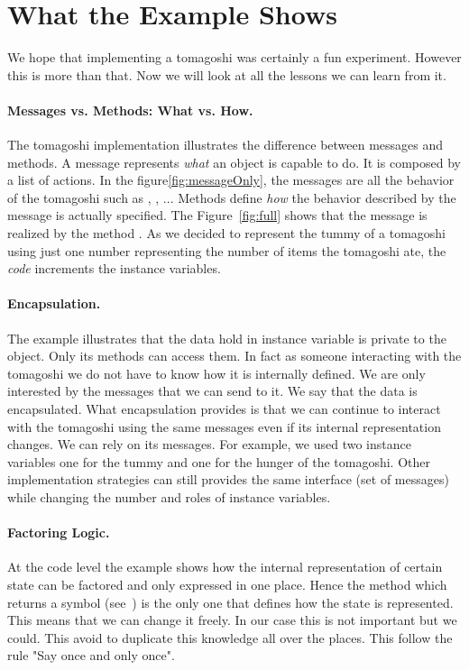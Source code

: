 \documentclass[a4paper,10pt,twoside]{book}
\begin{document}
\section{What the Example Shows}
We hope that implementing a tomagoshi was certainly a fun experiment. However this is more than that. Now we will look at all the lessons
we can learn from it. 


\paragraph{Messages vs. Methods: What vs. How.} The tomagoshi implementation illustrates the difference between messages and  methods. A message represents \textit{what} an object is capable to do. It is composed by a list of actions. 
In the figure\ref{fig:messageOnly}, the messages are all the behavior of the tomagoshi such as , , ... Methods define \textit{how} the behavior described by the message is actually specified. The Figure~\ref{fig:full} shows that the message  is realized by the method . As we decided to represent the tummy 
of a tomagoshi using just one number representing the number of items the tomagoshi ate, the \textit{code} 
increments the  instance variables. 




\paragraph{Encapsulation.} The example illustrates that the data hold in instance variable is private to the object. Only its methods can access them. In fact as someone interacting with the tomagoshi we do not have to know how it is internally defined. We are only interested by the messages that we can send to it. We say that the data is encapsulated. What encapsulation provides is that we can continue to interact with the
tomagoshi using the same messages even if its internal representation changes. We can rely on its messages.
For example, we used two instance variables one for the tummy and one for the hunger of the tomagoshi. Other implementation strategies can still provides the same interface (set of messages) while changing the number and roles of instance variables. 


\paragraph{Factoring Logic.}
At the code level the example shows how the internal representation of certain state can be factored and only expressed in one place. Hence the method  which returns a symbol (see~) is the only one that defines how the state is represented. This means that we can change it freely. In our case this is not important but we could. This avoid to duplicate this knowledge all over the places. This follow the rule "Say once and only once". 



\ifx\wholebook\relax\else
   
   
\end{document}
